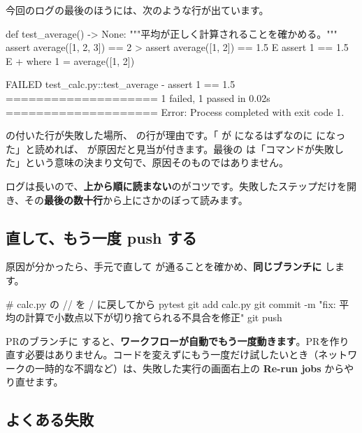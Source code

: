 今回のログの最後のほうには、次のような行が出ています。

\begin{codebox}[text]
\begin{code}
    def test_average() -> None:
        """平均が正しく計算されることを確かめる。"""
        assert average([1, 2, 3]) == 2
>       assert average([1, 2]) == 1.5
E       assert 1 == 1.5
E        +  where 1 = average([1, 2])

FAILED test_calc.py::test_average - assert 1 == 1.5
==================== 1 failed, 1 passed in 0.02s ====================
Error: Process completed with exit code 1.
\end{code}
\end{codebox}

\cmd{>} の付いた行が失敗した場所、 の行が理由です。「 が  になるはずなのに  になった」と読めれば、\cmd{//} が原因だと見当が付きます。最後の  は「コマンドが失敗した」という意味の決まり文句で、原因そのものではありません。

ログは長いので、\textbf{上から順に読まない}のがコツです。失敗したステップだけを開き、その\textbf{最後の数十行}から上にさかのぼって読みます。

\subsection{直して、もう一度 push する}

原因が分かったら、手元で直して  が通ることを確かめ、\textbf{同じブランチに } します。

\begin{codebox}[bash]
\begin{code}
# calc.py の // を / に戻してから
pytest
git add calc.py
git commit -m "fix: 平均の計算で小数点以下が切り捨てられる不具合を修正"
git push
\end{code}
\end{codebox}

PRのブランチに  すると、\textbf{ワークフローが自動でもう一度動きます}。PRを作り直す必要はありません。コードを変えずにもう一度だけ試したいとき（ネットワークの一時的な不調など）は、失敗した実行の画面右上の \textbf{Re-run jobs} からやり直せます。

\subsection{よくある失敗}

